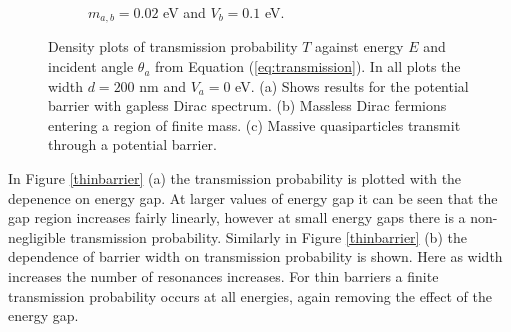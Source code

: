 \documentclass[12pt,a4paper]{report}
\begin{document}
\begin{figure}
\begin{subfigure}{0.3\textwidth}
		\caption{$m_{a,b}=0.02$ eV and $V_{b}=0.1$ eV.}
	\end{subfigure}
	\caption{Density plots of transmission probability $T$ against energy $E$ and incident angle $\theta_{a}$ from Equation (\ref{eq:transmission}). In all plots the width $d=200$ nm and $V_{a}=0$ eV. (a) Shows results for the potential barrier with gapless Dirac spectrum. (b) Massless Dirac fermions entering a region of finite mass. (c) Massive quasiparticles transmit through a potential barrier.}
	\label{transmissionplot}
\end{figure}

				In Figure \ref{thinbarrier} (a) the transmission probability is plotted with the depenence on energy gap. At larger values of energy gap it can be seen that the gap region increases fairly linearly, however at small energy gaps there is a non-negligible transmission probability. Similarly in Figure \ref{thinbarrier} (b) the dependence of barrier width on transmission probability is shown. Here as width increases the number of resonances increases. For thin barriers a finite transmission probability occurs at all energies, again removing the effect of the energy gap.
\end{document}

